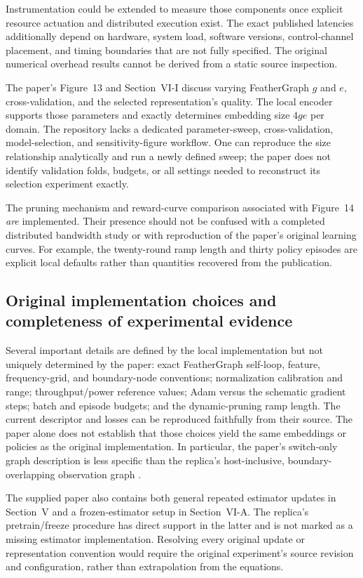 \documentclass[11pt,a4paper]{article}
\begin{document}
Instrumentation could be extended to measure those components once explicit
resource actuation and distributed execution exist. The exact published
latencies additionally depend on hardware, system load, software versions,
control-channel placement, and timing boundaries that are not fully specified.
The original numerical overhead results cannot be derived from a static
source inspection.

The paper's Figure~13 and Section~VI-I discuss varying FeatherGraph $g$ and
$e$, cross-validation, and the selected representation's quality. The local
encoder supports those parameters and exactly determines embedding size
$4ge$ per domain. The repository lacks a dedicated parameter-sweep,
cross-validation, model-selection, and sensitivity-figure workflow. One can
reproduce the size relationship analytically and run a newly defined sweep;
the paper does not identify validation folds, budgets, or all settings needed
to reconstruct its selection experiment exactly.

The pruning mechanism and reward-curve comparison associated with Figure~14
\emph{are} implemented. Their presence should not be confused with a completed
distributed bandwidth study or with reproduction of the paper's original
learning curves. For example, the twenty-round ramp length and thirty policy
episodes are explicit local defaults rather than quantities recovered from
the publication.

\subsection{Original implementation choices and completeness of experimental evidence}

Several important details are defined by the local implementation but not
uniquely determined by the paper: exact FeatherGraph self-loop, feature,
frequency-grid, and boundary-node conventions; normalization calibration and
range; throughput/power reference values; Adam versus the schematic gradient
steps; batch and episode budgets; and the dynamic-pruning ramp length.
The current descriptor and losses can be reproduced faithfully from their
source. The paper alone does not establish that those choices yield the
same embeddings or policies as the original implementation. In particular,
the paper's switch-only graph description is less specific than the replica's
host-inclusive, boundary-overlapping observation graph
\cite{paper,code-embedding,code-learning,code-settings}.

The supplied paper also contains both general repeated estimator updates in
Section~V and a frozen-estimator setup in Section~VI-A. The replica's
pretrain/freeze procedure has direct support in the latter and is not marked
as a missing estimator implementation. Resolving every original update or
representation convention would require the original experiment's source
revision and configuration, rather than extrapolation from the equations.
\end{document}
